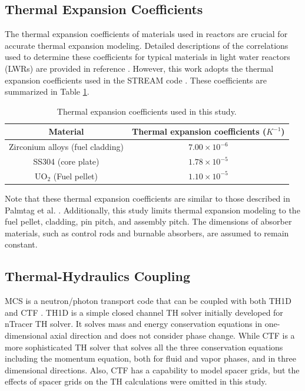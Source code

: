 \subsection{Thermal Expansion Coefficients} \label{sec32}

The thermal expansion coefficients of materials used in reactors are crucial for accurate thermal expansion modeling. Detailed descriptions of the correlations used to determine these coefficients for typical materials in light water reactors (LWRs) are provided in reference \cite{palmtag}. However, this work adopts the thermal expansion coefficients used in the STREAM code \cite{choi_2021}. These coefficients are summarized in Table \ref{tab1}.
\begin{table}
    \centering
    \caption{Thermal expansion coefficients used in this study.}
    \label{tab1} 
   \begin{adjustbox}{width=0.72\textwidth} %
    \begin{tabular}{| c | c | }
    \hline 
     Material & Thermal expansion coefficients ($K^{-1}$) \\
     \hline
     Zirconium alloys (fuel cladding)     & $7.00\times10^{-6}$      \\ \hline
     SS304 (core plate)                   & $1.78\times10^{-5}$      \\ \hline
     UO$_2$ (Fuel pellet)                 & $1.10\times10^{-5}$      \\ \hline
    \end{tabular}
    \end{adjustbox}
\end{table}

Note that these thermal expansion coefficients are similar to those described in Palmtag et al. \cite{palmtag}. Additionally, this study limits thermal expansion modeling to the fuel pellet, cladding, pin pitch, and assembly pitch. The dimensions of absorber materials, such as control rods and burnable absorbers, are assumed to remain constant.

\subsection{Thermal-Hydraulics Coupling} \label{sec33a}

MCS is a neutron/photon transport code that can be coupled with both TH1D \cite{ryu_2015} and CTF \cite{salko}. TH1D is a simple closed channel TH solver initially developed for nTracer TH solver. It solves mass and energy conservation equations in one-dimensional axial direction and does not consider phase change. While CTF is a more sophisticated TH solver that solves all the three conservation equations including the momentum equation, both for fluid and vapor phases, and in three dimensional directions. Also, CTF has a capability to model spacer grids, but the effects of spacer grids on the TH calculations were omitted in this study.

